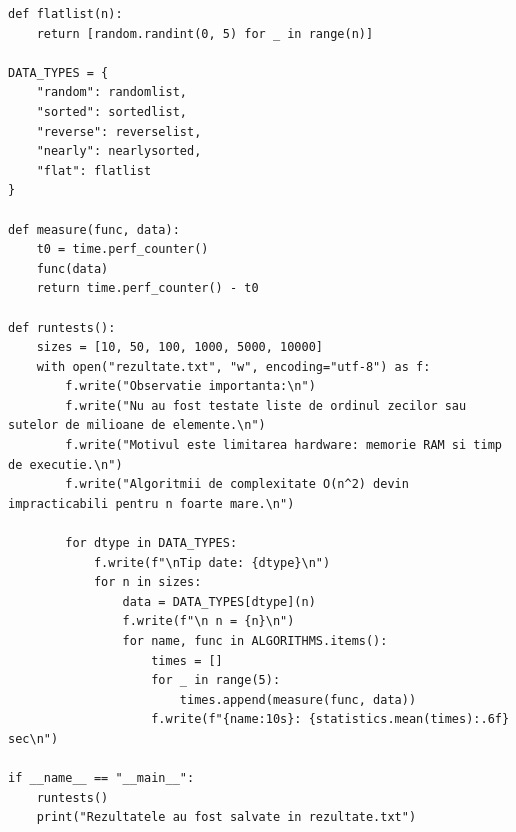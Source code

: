 \documentclass[a4paper,12pt]{article}
\begin{document}
\begin{lstlisting}[style=mypython, caption={Codul complet al proiectului}]
def flatlist(n):
    return [random.randint(0, 5) for _ in range(n)]

DATA_TYPES = {
    "random": randomlist,
    "sorted": sortedlist,
    "reverse": reverselist,
    "nearly": nearlysorted,
    "flat": flatlist
}

def measure(func, data):
    t0 = time.perf_counter()
    func(data)
    return time.perf_counter() - t0

def runtests():
    sizes = [10, 50, 100, 1000, 5000, 10000]
    with open("rezultate.txt", "w", encoding="utf-8") as f:
        f.write("Observatie importanta:\n")
        f.write("Nu au fost testate liste de ordinul zecilor sau sutelor de milioane de elemente.\n")
        f.write("Motivul este limitarea hardware: memorie RAM si timp de executie.\n")
        f.write("Algoritmii de complexitate O(n^2) devin impracticabili pentru n foarte mare.\n")

        for dtype in DATA_TYPES:
            f.write(f"\nTip date: {dtype}\n")
            for n in sizes:
                data = DATA_TYPES[dtype](n)
                f.write(f"\n n = {n}\n")
                for name, func in ALGORITHMS.items():
                    times = []
                    for _ in range(5):
                        times.append(measure(func, data))
                    f.write(f"{name:10s}: {statistics.mean(times):.6f} sec\n")

if __name__ == "__main__":
    runtests()
    print("Rezultatele au fost salvate in rezultate.txt")
\end{lstlisting}
\end{document}
